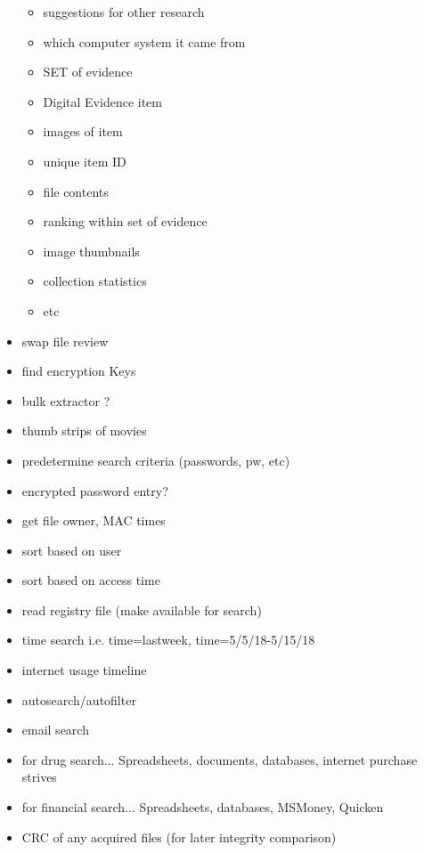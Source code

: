 \documentclass[12pt]{article}
\begin{document}
\begin{itemize}
\begin{itemize}
    \item suggestions for other research
    \item which computer system it came from
    \item SET of evidence
    \item Digital Evidence item
    \item images of item
    \item unique item ID
    \item file contents
    \item ranking within set of evidence
    \item image thumbnails
    \item collection statistics
    \item etc
  \end{itemize}
  \item swap file review
  \item find encryption Keys 
  \item bulk extractor ? 
  \item thumb strips of movies
  \item predetermine search criteria (passwords, pw, etc)
  \item encrypted password entry?
  \item get file owner, MAC times
  \item sort based on user
  \item sort based on access time
  \item read registry file (make available for search)
  \item time search i.e. time=lastweek, time=5/5/18-5/15/18
  \item internet usage timeline
  \item autosearch/autofilter
  \item email search
  \item for drug search... Spreadsheets, documents, databases, internet purchase strives
  \item for financial search... Spreadsheets, databases, MSMoney, Quicken
  \item CRC of any acquired files (for later integrity comparison)
\end{itemize}

\newpage
\end{document}
